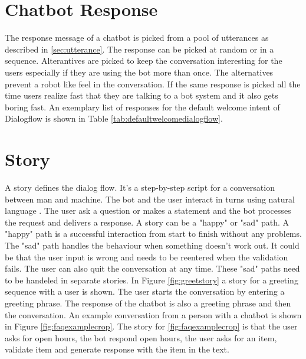 \section{Chatbot Response} \label{sec:chatbot_response}
The response message of a chatbot is picked from a pool of utterances as described in \ref{sec:utterance}.
The response can be picked at random or in a sequence.
Alterantives are picked to keep the conversation interesting for the users especially
if they are using the bot more than once.
The alternatives prevent a robot like feel in the conversation. 
If the same response is picked all the time users realize fast that they are 
talking to a bot system and it also gets boring fast. 
An exemplary list of responses for the default welcome intent of Dialogflow is shown in Table \ref{tab:defaultwelcomedialogflow}.



\section{Story}
A story defines the dialog flow. 
It's a step-by-step script for a conversation between man and machine.
The bot and the user interact in turns using natural language \cite{evaluateChatbotsShawar2007, shawar2007chatbots, huang2007extracting, gregori2017evaluation}.
The user ask a question or makes a statement and the bot processes the request and delivers a response.
A story can be a "happy" or "sad" path.
A "happy" path is a successful interaction from start to finish without any problems.
The "sad" path handles the behaviour when something doesn't work out.
It could be that the user input is wrong and needs to be reentered when the validation fails.
The user can also quit the conversation at any time.
These "sad" paths need to be handeled in separate stories.
In Figure \ref{fig:greetstory} a story for a greeting sequence with a user is shown. 
The user starts the conversation by entering a greeting phrase. 
The response of the chatbot is also a greeting phrase and then the conversation. 
An example conversation from a person with a chatbot is shown in Figure \ref{fig:faqexamplecrop}.
The story for \ref{fig:faqexamplecrop} is that the user asks for open hours, the bot respond open hours, 
the user asks for an item, validate item and generate response with the item in the text.


